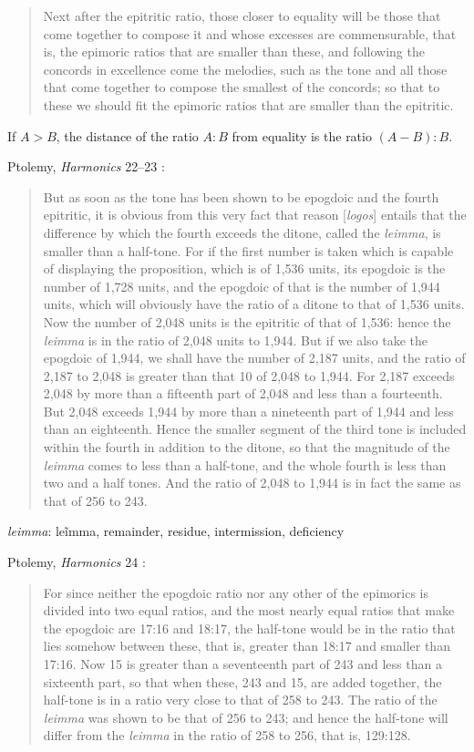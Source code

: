 \documentclass{article}
\newcommand{\textgreek}[1]{\begingroup\fontencoding{LGR}\selectfont#1\endgroup}
\theoremstyle{definition}
\begin{document}
\begin{quote}
Next after the epitritic ratio, those closer to equality will be those that come
together to compose it and whose excesses are commensurable, that is, the
epimoric ratios that are smaller than these, and following the concords in
excellence come the melodies, such as the tone and all those that come together
to compose the smallest of the concords; so that to these we should fit the
epimoric ratios that are smaller than the epitritic.
\end{quote}

If $A>B$,
the distance of the ratio $A:B$ from equality is the ratio $(A-B):B$.

Ptolemy, {\em Harmonics} 22--23 \cite[pp.~296--297]{barker}:

\begin{quote}
But as soon as the tone has been shown to be epogdoic and the fourth
epitritic, it is obvious from this very fact that reason [{\em logos}] entails that the
difference by which the fourth exceeds the ditone, called the {\em leimma}, is smaller
than a half-tone. For if the first number is taken which is capable of displaying
the proposition, which is of 1,536 units, its epogdoic is the number of 1,728
units, and the epogdoic of that is the number of 1,944 units, which will
obviously have the ratio of a ditone to that of 1,536 units. Now the number of
2,048 units is the epitritic of that of 1,536: hence the {\em leimma} is in the ratio of
2,048 units to 1,944. But if we also take the epogdoic of 1,944, we shall have
the number of 2,187 units, and the ratio of 2,187 to 2,048 is greater than that
10 of 2,048 to 1,944. For 2,187 exceeds 2,048 by more than a fifteenth part of 2,048
and less than a fourteenth. But 2,048 exceeds 1,944 by more than a nineteenth
part of 1,944 and less than an eighteenth. Hence the smaller segment of the
third tone is included within the fourth in addition to the ditone, so that the
magnitude of the {\em leimma} comes to less than a half-tone, and the whole fourth
is less than two and a half tones. And the ratio of 2,048 to 1,944 is in fact
the same as that of 256 to 243.
\end{quote}

{\em leimma}: \textgreek{le\~imma}, remainder, residue, intermission, deficiency

Ptolemy, {\em Harmonics} 24 \cite[pp.~297--298]{barker}:

\begin{quote}
For since
neither the epogdoic ratio nor any other of the epimorics is divided into two
equal ratios, and the most nearly equal ratios that make the epogdoic are
17:16 and 18:17, the half-tone would be in the ratio that lies somehow between
these, that is, greater than 18:17 and smaller than 17:16. Now 15 is greater
than a seventeenth part of 243 and less than a sixteenth part, so that when
these, 243 and 15, are added together, the half-tone is in a ratio very close to
that of 258 to 243. The ratio of the {\em leimma} was shown to be that of 256 to 243;
and hence the half-tone will differ from the {\em leimma} in the ratio of 258 to 256,
that is, 129:128.
\end{quote}
\end{document}
